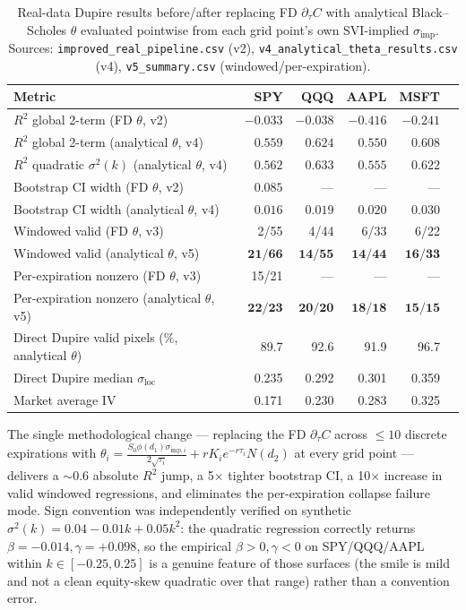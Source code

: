 \documentclass[10pt]{article}
\begin{document}
\begin{table}[h]
\centering\footnotesize
\caption{Real-data Dupire results before/after replacing FD $\partial_\tau C$ with analytical Black--Scholes $\theta$ evaluated pointwise from each grid point's own SVI-implied $\sigma_{\text{imp}}$. Sources: \texttt{improved\_real\_pipeline.csv} (v2), \texttt{v4\_analytical\_theta\_results.csv} (v4), \texttt{v5\_summary.csv} (windowed/per-expiration).}
\label{tab:tau-fix}
\begin{tabular}{lrrrrr}
\toprule
Metric & SPY & QQQ & AAPL & MSFT \\
\midrule
$R^2$ global 2-term (FD $\theta$, v2) & $-0.033$ & $-0.038$ & $-0.416$ & $-0.241$ \\
$R^2$ global 2-term (analytical $\theta$, v4) & $\mathbf{0.559}$ & $\mathbf{0.624}$ & $\mathbf{0.550}$ & $\mathbf{0.608}$ \\
$R^2$ quadratic $\sigma^2(k)$ (analytical $\theta$, v4) & $0.562$ & $0.633$ & $0.555$ & $0.622$ \\
Bootstrap CI width (FD $\theta$, v2) & $0.085$ & --- & --- & --- \\
Bootstrap CI width (analytical $\theta$, v4) & $\mathbf{0.016}$ & $\mathbf{0.019}$ & $\mathbf{0.020}$ & $\mathbf{0.030}$ \\
Windowed valid (FD $\theta$, v3) & 2/55 & 4/44 & 6/33 & 6/22 \\
Windowed valid (analytical $\theta$, v5) & $\mathbf{21/66}$ & $\mathbf{14/55}$ & $\mathbf{14/44}$ & $\mathbf{16/33}$ \\
Per-expiration nonzero (FD $\theta$, v3) & 15/21 & --- & --- & --- \\
Per-expiration nonzero (analytical $\theta$, v5) & $\mathbf{22/23}$ & $\mathbf{20/20}$ & $\mathbf{18/18}$ & $\mathbf{15/15}$ \\
Direct Dupire valid pixels (\%, analytical $\theta$) & 89.7 & 92.6 & 91.9 & 96.7 \\
Direct Dupire median $\sigma_{\text{loc}}$ & 0.235 & 0.292 & 0.301 & 0.359 \\
Market average IV & 0.171 & 0.230 & 0.283 & 0.325 \\
\bottomrule
\end{tabular}
\end{table}

The single methodological change --- replacing the FD $\partial_\tau C$ across $\le10$ discrete expirations with $\theta_i{=}\frac{S_0\phi(d_1)\sigma_{\text{imp},i}}{2\sqrt{\tau_i}}+rK_ie^{-r\tau_i}N(d_2)$ at every grid point --- delivers a $\sim$0.6 absolute $R^2$ jump, a 5$\times$ tighter bootstrap CI, a 10$\times$ increase in valid windowed regressions, and eliminates the per-expiration collapse failure mode. Sign convention was independently verified on synthetic $\sigma^2(k){=}0.04{-}0.01k{+}0.05k^2$: the quadratic regression correctly returns $\beta{=}{-}0.014, \gamma{=}{+}0.098$, so the empirical $\beta{>}0, \gamma{<}0$ on SPY/QQQ/AAPL within $k\in[{-}0.25, 0.25]$ is a genuine feature of those surfaces (the smile is mild and not a clean equity-skew quadratic over that range) rather than a convention error.
\end{document}
